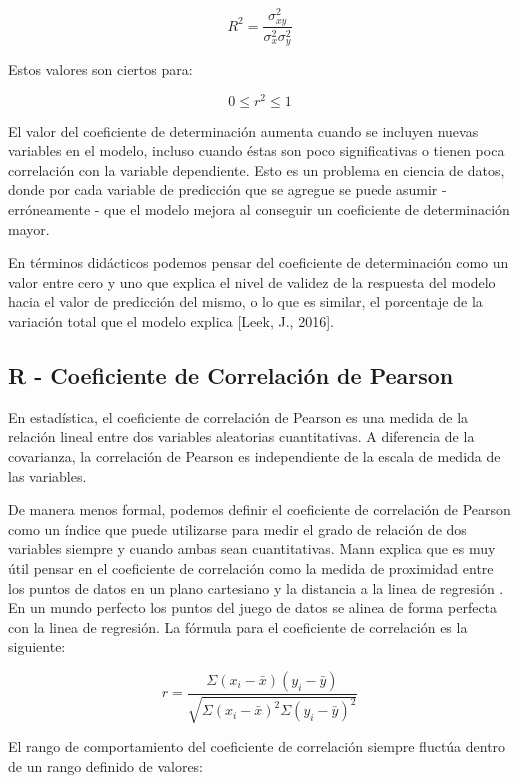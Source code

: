 \documentclass[letterpaper, spanish, 11pt]{report}
\begin{document}
\begin{equation}
 R^{2} = \frac{\sigma^2_{xy}}{\sigma^{2}_{x}\sigma^2_{y}}
\end{equation}

Estos valores son ciertos para:

\[ 0 \leq r^{2} \leq 1 \]

El valor del coeficiente de determinación aumenta cuando se incluyen nuevas variables en el modelo, incluso cuando éstas son poco significativas o tienen poca correlación con la variable dependiente. Esto es un problema en ciencia de datos, donde por cada variable de predicción que se agregue se puede asumir - erróneamente - que el modelo mejora al conseguir un coeficiente de determinación mayor.

En términos didácticos podemos pensar del coeficiente de determinación como un valor entre cero y uno que explica el nivel de validez de la respuesta del modelo hacia el valor de predicción del mismo, o lo que es similar, el porcentaje de la variación total que el modelo explica [Leek, J., 2016].

\subsection{R - Coeficiente de Correlación de Pearson}
En estadística, el coeficiente de correlación de Pearson es una medida de la relación lineal entre dos variables aleatorias cuantitativas. A diferencia de la covarianza, la correlación de Pearson es independiente de la escala de medida de las variables.

De manera menos formal, podemos definir el coeficiente de correlación de Pearson como un índice que puede utilizarse para medir el grado de relación de dos variables siempre y cuando ambas sean cuantitativas. Mann explica que es muy útil pensar en el coeficiente de correlación como la medida de proximidad entre los puntos de datos en un plano cartesiano y la distancia a la linea de regresión \cite{intoStats7}. En un mundo perfecto los puntos del juego de datos se alinea de forma perfecta con la linea de regresión. La fórmula para el coeficiente de correlación es la siguiente:

\begin{equation}
r = \frac{\Sigma(x_i - \bar{x})(y_i - \bar{y})}{\sqrt{\Sigma(x_i - \bar{x})^2\Sigma(y_i - \bar{y})^2}}
\end{equation}

El rango de comportamiento del coeficiente de correlación siempre fluctúa dentro de un rango definido de valores:
\end{document}
